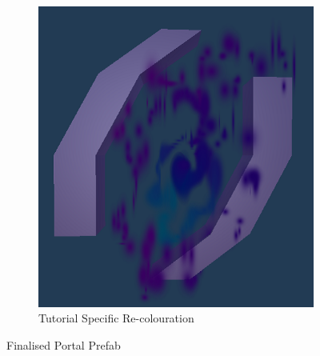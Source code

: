 \begin{figure}[H]
\begin{subfigure}{0.4\textwidth}
  \includegraphics[width=1\linewidth]{Figures/finportb.png}
  \caption{Tutorial Specific Re-colouration}
\end{subfigure}
\caption{Finalised Portal Prefab}
\label{portals}
\end{figure}

